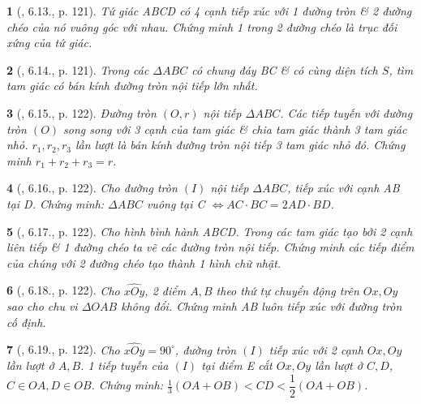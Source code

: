 \documentclass{article}
\newtheorem{baitoan}{}
\begin{document}
\begin{baitoan}[\cite{Binh_boi_duong_Toan_9_tap_1}, 6.13., p. 121]
	Tứ giác ABCD có 4 cạnh tiếp xúc với 1 đường tròn \& 2 đường chéo của nó vuông góc với nhau. Chứng minh 1 trong 2 đường chéo là trục đối xứng của tứ giác.
\end{baitoan}

\begin{baitoan}[\cite{Binh_boi_duong_Toan_9_tap_1}, 6.14., p. 121]
	Trong các $\Delta ABC$ có chung đáy BC \& có cùng diện tích $S$, tìm tam giác có bán kính đường tròn nội tiếp lớn nhất.
\end{baitoan}

\begin{baitoan}[\cite{Binh_boi_duong_Toan_9_tap_1}, 6.15., p. 122]
	Đường tròn $(O,r)$ nội tiếp $\Delta ABC$. Các tiếp tuyến với đường tròn $(O)$ song song với 3 cạnh của tam giác \& chia tam giác thành 3 tam giác nhỏ. $r_1,r_2,r_3$ lần lượt là bán kính đường tròn nội tiếp 3 tam giác nhỏ đó. Chứng minh $r_1 + r_2 + r_3 = r$.
\end{baitoan}

\begin{baitoan}[\cite{Binh_boi_duong_Toan_9_tap_1}, 6.16., p. 122]
	Cho đường tròn $(I)$ nội tiếp $\Delta ABC$, tiếp xúc với cạnh AB tại D. Chứng minh: $\Delta ABC$ vuông tại C $\Leftrightarrow AC\cdot BC = 2AD\cdot BD$.
\end{baitoan}

\begin{baitoan}[\cite{Binh_boi_duong_Toan_9_tap_1}, 6.17., p. 122]
	Cho hình bình hành ABCD. Trong các tam giác tạo bởi 2 cạnh liên tiếp \& 1 đường chéo ta vẽ các đường tròn nội tiếp. Chứng minh các tiếp điểm của chúng với 2 đường chéo tạo thành 1 hình chữ nhật.
\end{baitoan}

\begin{baitoan}[\cite{Binh_boi_duong_Toan_9_tap_1}, 6.18., p. 122]
	Cho $\widehat{xOy}$, 2 điểm $A,B$ theo thứ tự chuyển động trên $Ox,Oy$ sao cho chu vi $\Delta OAB$ không đổi. Chứng minh AB luôn tiếp xúc với đường tròn cố định.
\end{baitoan}

\begin{baitoan}[\cite{Binh_boi_duong_Toan_9_tap_1}, 6.19., p. 122]
	Cho $\widehat{xOy} = 90^\circ$, đường tròn $(I)$ tiếp xúc với 2 cạnh $Ox,Oy$ lần lượt ở $A,B$. 1 tiếp tuyến của $(I)$ tại điểm E cắt $Ox,Oy$ lần lượt ở $C,D$, $C\in OA,D\in OB$. Chứng minh: $\frac{1}{3}(OA + OB) < CD < \dfrac{1}{2}(OA + OB)$.
\end{baitoan}
\end{document}
